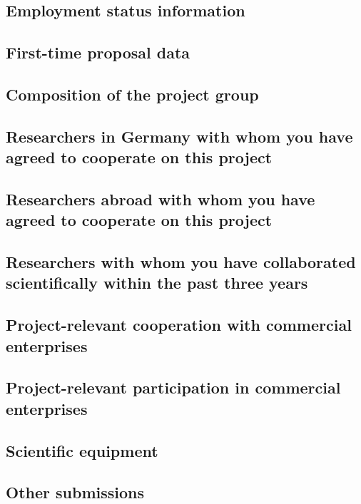 \documentclass{scrartcl}
\begin{document}
\subsection{Employment status information}

\subsection{First-time proposal data}

\subsection{Composition of the project group}

\subsection{Researchers in Germany with whom you have agreed to cooperate on this project}

\subsection{Researchers abroad with whom you have agreed to cooperate on this project}

\subsection{Researchers with whom you have collaborated scientifically within the past three years}

\subsection{Project-relevant cooperation with commercial enterprises}

\subsection{Project-relevant participation in commercial enterprises}

\subsection{Scientific equipment}

\subsection{Other submissions}
\end{document}
